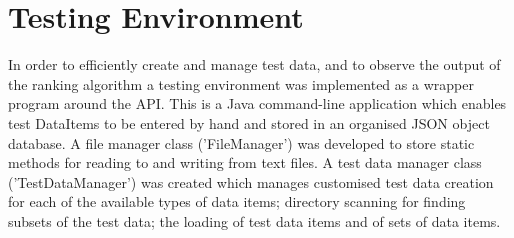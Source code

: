 \section{Testing Environment}

In order to efficiently create and manage test data, and to observe the output of the ranking algorithm a testing environment was implemented as a wrapper program around the API. This is a Java command-line application which enables test DataItems to be entered by hand and stored in an organised JSON object database.
A file manager class ('FileManager') was developed to store static methods for reading to and writing from text files. A test data manager class ('TestDataManager') was created which manages customised test data creation for each of the available types of data items; directory scanning for finding subsets of the test data; the loading of test data items and of sets of data items. 





